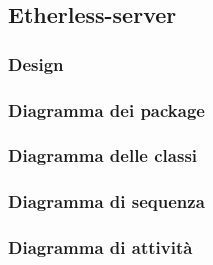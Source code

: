 \subsection{Etherless-server}
\subsubsection{Design}
\subsubsection{Diagramma dei package}
\subsubsection{Diagramma delle classi}
\subsubsection{Diagramma di sequenza}
\subsubsection{Diagramma di attività}

